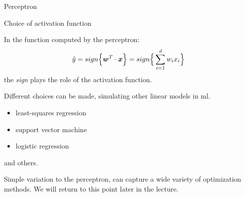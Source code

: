 %
%
%

\begin{frame}[t]{Perceptron}


\end{frame}




%
%
%

\begin{frame}[t]{Choice of activation function}

    In the function computed by the \gls{perceptron}: 
    \begin{equation}
        \hat{y} = sign\Big\{ \boldsymbol{w}^T \cdot \boldsymbol{x} \Big\} = sign\Big\{ \sum_{i=1}^{d} w_i x_i \Big\}
    \end{equation}        
    the {\em sign} plays the role of the \gls{activation function}.\\
    \vspace{0.2cm}

    Different choices can be made, 
    simulating other \glspl{linear model} in \gls{ml}.
    \begin{itemize}
        \item least-squares regression
        \item support vector machine
        \item logistic regression
    \end{itemize}
    and others.

    Simple variation to the \gls{perceptron}, can capture a wide variety of optimization methods.
    We will return to this point later in the lecture.\\

\end{frame}


%
%
%

